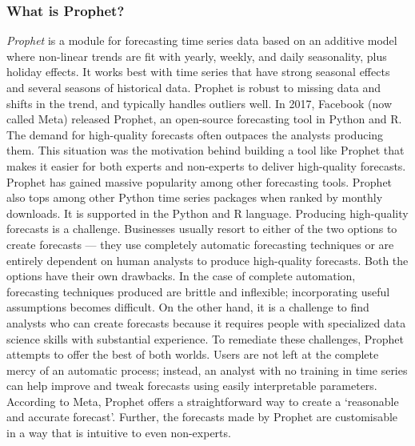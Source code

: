 \subsubsection{What is Prophet?}
\textit{Prophet} is a module for forecasting time series data based on an additive model where non-linear trends are fit with yearly, weekly, and daily seasonality, plus holiday effects. It works best with time series that have strong seasonal effects and several seasons of historical data. Prophet is robust to missing data and shifts in the trend, and typically handles outliers well.
In 2017, Facebook (now called Meta) released Prophet, an open-source forecasting tool in Python and R. The demand for high-quality forecasts often outpaces the analysts producing them. This situation was the motivation behind building a tool like Prophet that makes it easier for both experts and non-experts to deliver high-quality forecasts. Prophet has gained massive popularity among other forecasting tools. Prophet also tops among other Python time series packages when ranked by monthly downloads. It is supported in the Python and R language.
Producing high-quality forecasts is a challenge. Businesses usually resort to either of the two options to create forecasts — they use completely automatic forecasting techniques or are entirely dependent on human analysts to produce high-quality forecasts. Both the options have their own drawbacks. In the case of complete automation, forecasting techniques produced are brittle and inflexible; incorporating useful assumptions becomes difficult. On the other hand, it is a challenge to find analysts who can create forecasts because it requires people with specialized data science skills with substantial experience. To remediate these challenges, Prophet attempts to offer the best of both worlds. Users are not left at the complete mercy of an automatic process; instead, an analyst with no training in time series can help improve and tweak forecasts using easily interpretable parameters. According to Meta, Prophet offers a straightforward way to create a ‘reasonable and accurate forecast’. Further, the forecasts made by Prophet are customisable in a way that is intuitive to even non-experts.


